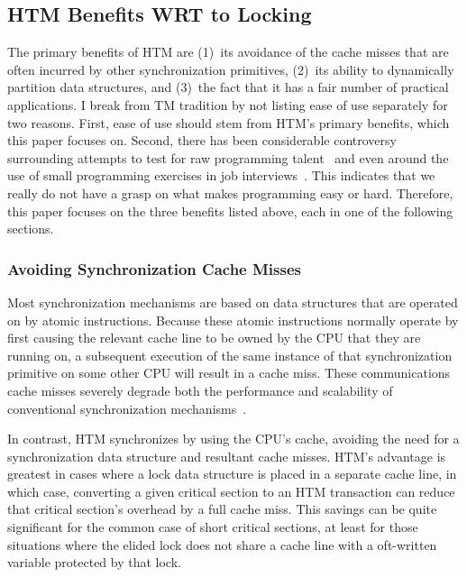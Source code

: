 \subsection{HTM Benefits WRT to Locking}
\label{sec:future:HTM Benefits WRT to Locking}

The primary benefits of HTM are
(1)~its avoidance of the cache misses that are often incurred by
other synchronization primitives,
(2)~its ability to dynamically partition
data structures,
and (3)~the fact that it has
a fair number of practical applications.
I break from TM tradition by not listing ease of use separately
for two reasons.
First, ease of use should stem from HTM's primary benefits,
which this paper focuses on.
Second, there has been considerable controversy surrounding attempts to
test for raw programming
talent~\cite{RichardBornat2006SheepGoats,SaeedDehnadi2009SheepGoats}
and even around the use of small programming exercises in job
interviews~\cite{RegBraithwaite2007FizzBuzz}.
This indicates that we really do not have a grasp on what makes
programming easy or hard.
Therefore, this paper focuses on the three benefits listed above,
each in one of the following sections.

\subsubsection{Avoiding Synchronization Cache Misses}
\label{sec:future:Avoiding Synchronization Cache Misses}

Most synchronization mechanisms are based on data structures that are
operated on by atomic instructions.
Because these atomic instructions normally operate by first causing
the relevant cache line to be owned by the CPU that they are running on,
a subsequent execution
of the same instance of that synchronization primitive on some other
CPU will result in a cache miss.
These communications cache misses severely degrade both the performance and
scalability of conventional synchronization
mechanisms~\cite[Section 4.2.3]{Anderson97}.

In contrast, HTM synchronizes by using the CPU's cache, avoiding the need
for a synchronization data structure and resultant cache misses.
HTM's advantage is greatest in cases where a lock data structure is
placed in a separate cache line, in which case, converting a given
critical section to an HTM transaction can reduce that critical section's
overhead by a full cache miss.
This savings can be quite significant for the common case of short
critical sections, at least for those situations where the elided lock
does not share a cache line with a oft-written variable protected by
that lock.

